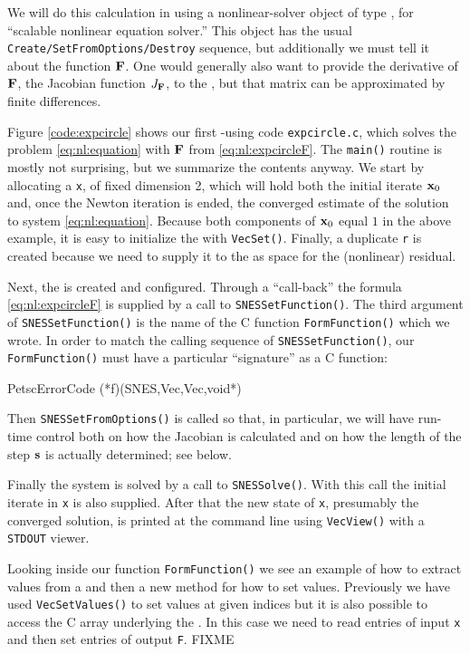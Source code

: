 We will do this calculation in \PETSc using a nonlinear-solver object of type \pSNES, for ``scalable nonlinear equation solver.''  This object has the usual \texttt{Create/SetFromOptions/Destroy} sequence, but additionally we must tell it about the function $\mathbf{F}$.  One would generally also want to provide the derivative of $\mathbf{F}$, the Jacobian function $J_{\mathbf{F}}$, to the \pSNES, but that matrix can be approximated by finite differences.

Figure \ref{code:expcircle} shows our first \pSNES-using code \texttt{expcircle.c}, which solves the problem \eqref{eq:nl:equation} with $\mathbf{F}$ from \eqref{eq:nl:expcircleF}.  The \texttt{main()} routine is mostly not surprising, but we summarize the contents anyway.  We start by allocating a \pVec \texttt{x}, of fixed dimension 2, which will hold both the initial iterate $\mathbf{x}_0$ and, once the Newton iteration is ended, the converged estimate of the solution to system \eqref{eq:nl:equation}.  Because both components of $\mathbf{x}_0$ equal $1$ in the above example, it is easy to initialize the \pVec with \texttt{VecSet()}.  Finally, a duplicate \pVec \texttt{r} is created because we need to supply it to the \pSNES as space for the (nonlinear) residual.

Next, the \pSNES is created and configured.  Through a ``call-back'' the formula \eqref{eq:nl:expcircleF} is supplied by a call to \texttt{SNESSetFunction()}.  The third argument of \texttt{SNESSetFunction()} is the name of the C function \texttt{FormFunction()} which we wrote.  In order to match the calling sequence of \texttt{SNESSetFunction()}, our \texttt{FormFunction()} must have a particular ``signature'' as a C function:
\begin{code}
PetscErrorCode (*f)(SNES,Vec,Vec,void*)
\end{code}
Then \texttt{SNESSetFromOptions()} is called so that, in particular, we will have run-time control both on how the Jacobian is calculated and on how the length of the step $\mathbf{s}$ is actually determined; see below.

Finally the system is solved by a call to \texttt{SNESSolve()}.  With this call the initial iterate in \texttt{x} is also supplied.  After that the new state of \texttt{x}, presumably the converged solution, is printed at the command line using \texttt{VecView()} with a \texttt{STDOUT} viewer.

\vfill
{}

Looking inside our function \texttt{FormFunction()} we see an example of how to extract values from a \pVec and then a new method for how to set values.  Previously we have used \texttt{VecSetValues()} to set values at given indices but it is also possible to access the C array underlying the \pVec.  In this case we need to read entries of input \texttt{x} and then set entries of output \texttt{F}.  FIXME

